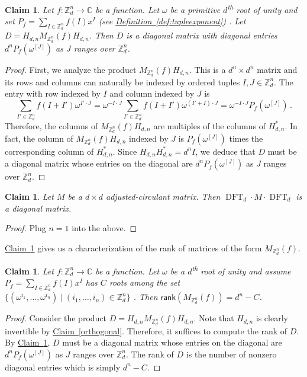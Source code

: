 \documentclass[11pt]{article}
\numberwithin{equation}{section}
\newtheorem{claim}[theorem]{Claim}
\theoremstyle{definition}
\theoremstyle{plain}
\newcommand{\C}{\mathbb C}
\newcommand{\Z}{\mathbb Z}
\newcommand{\expref}[2]{\hyperref[#2]{#1~\ref{#2}}}
\theoremstyle{definition}
\renewcommand\Z{{\mathbb{Z}}}
\renewcommand\C{{\mathbb{C}}}
\newcommand\rank{\textsf{rank}}
\newcommand{\ts}{\textsuperscript}
\DeclareMathOperator{\DFT}{DFT}
\begin{document}
\begin{claim} \label{Hadamard_diagonalization}
Let $f: \Z_d^n \rightarrow \C$ be a function.  Let $\omega$ be a %
primitive  %
%
$d$\ts{th}
%
root of unity and set $P_f = \sum_{I \in \Z_d^n} f(I)x^I$ %
(see \expref{Definition}{def:tupleexponent})%
.  Let $D = H_{d,n}M_{\Z_d^n}(f)H_{d,n}$.  Then $D$ is a diagonal matrix with diagonal entries $d^nP_f(\omega^{[J]})$ as $J$ ranges over $\Z_d^n$.
\end{claim}
\begin{proof}
First, we analyze the product $M_{\Z_d^n}(f)H_{d,n}$.  This is a $d^n \times d^n$ matrix and its rows and columns can naturally be indexed by ordered tuples $I,J \in \Z_d^n$.  The entry with row indexed by $I$ and column indexed by $J$ is
\[
\sum_{I' \in \Z_d^n} f(I + I')\omega^{I' \cdot J} = \omega^{-I \cdot J}\sum_{I' \in \Z_d^n} f(I + I')\omega^{(I'+I) \cdot J} = \omega^{-I \cdot J} P_f(\omega^{[J]}) \,.
\]
Therefore, the columns of $M_{\Z_d^n}(f)H_{d,n}$ are multiples of the columns of $H_{d,n}^*$.  In fact, the column of $M_{\Z_d^n}(f)H_{d,n}$ indexed by $J$ is $P_f(\omega^{[J]})$ times the corresponding column of $H_{d,n}^*$.  Since $H_{d,n}H_{d,n}^* = d^nI$, %
we deduce that %
$D$ must be a diagonal matrix whose entries on the diagonal are $d^nP_f(\omega^{[J]})$ as $J$ ranges over $\Z_d^n$. 
\end{proof}

\begin{claim}\label{Fourier_diagonalization}
Let $M$ be a $d \times d$ adjusted-circulant matrix.  Then %
$\DFT_d \cdot  M  \cdot \DFT_d$ %
is a diagonal matrix.
\end{claim}
\begin{proof}
Plug $n=1$ into the above.
\end{proof}



\expref{Claim}{Hadamard_diagonalization} gives us a characterization of the rank of matrices of the form $M_{\Z_d^n}(f)$.
\begin{claim} \label{rankcomp}
Let $f: \Z_d^n \rightarrow \C$ be a function.  Let $\omega$ be a %
$d$\ts{th}
%
root of unity and 
%
assume %
$P_f = \sum_{I \in \Z_d^n} f(I)x^I$ has $C$ roots among the set %
$\{ (\omega^{i_1}, \dots , \omega^{i_n}) \mid (i_1, \dots , i_n) \in \Z_d^n \}$ %
.
Then $\rank(M_{\Z_d^n}(f)) = d^n - C$.
\end{claim}
\begin{proof}
Consider the product $D = H_{d,n}M_{\Z_d^n}(f)H_{d,n}$.  Note that $H_{d,n}$ is clearly invertible by \expref{Claim}{orthogonal}.  Therefore, it suffices to compute the rank of $D$.  By \expref{Claim}{Hadamard_diagonalization}, $D$ must be a diagonal matrix whose entries on the diagonal are $d^nP_f(\omega^{[J]})$ as $J$ ranges over $\Z_d^n$.  The rank of $D$ is the number of nonzero diagonal entries which is simply $d^n - C$.
\end{proof}
\end{document}
